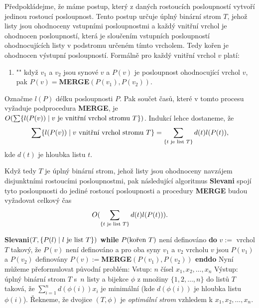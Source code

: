 \documentclass[a4paper,12pt]{article}
\begin{document}
Předpokládejme, že máme postup, který z 
daných rostoucích posloupností vytvoří 
jedinou rostoucí po\-sloupnost. Tento postup určuje úplný 
binární strom $T$, jehož listy jsou ohodnoceny vstupními 
posloupnostmi a každý vnitřní vr\-chol je ohodnocen 
posloupností, která je sloučením vstupních posloupností 
ohodnocujících listy v podstromu určeném tímto 
vr\-cholem. Tedy kořen je ohodnocen výstupní posloupností. 
Formálně pro každý vnitřní vr\-chol  $v$ platí:
\begin{enumerate}
\item"{}"
když  $v_1$ a $v_2$ jsou synové $v$ a $P(v)$ je posloupnost 
ohodnocující vrchol $v$,  pak\newline 
$P(v)=${\bf MERGE$(P(v_1),P(v_2))$}.
\end{enumerate}
Označme $l(P)$ délku posloupnosti $P$. Pak součet 
časů, které v tomto procesu vyžaduje 
podprocedura {\bf MERGE},
je $O(\sum \{l(P(v))\mid v\text{\rm \ je vnitřní vrchol stromu }
T\})$. Indukcí 
lehce dostaneme, že 
$$\sum \{l(P(v))\mid v\text{\rm \ vnitřní vrchol stromu }T
\}=\sum_{\{t\text{\rm \ je list }T\}}d(t)l(P(t)),$$
kde $d(t)$ je hloubka listu $t$.

Když tedy $T$ je úplný binární strom, jehož listy
jsou ohodnoceny navzájem disjunktními rostoucími  
posloupnostmi, pak následující algoritmus {\bf Slevani} spojí tyto  
posloupnosti do jediné rostoucí posloupnosti a procedury 
{\bf MERGE} budou vyžadovat celkový čas 
$$O(\sum_{\{t\text{\rm \ je list }T\}}d(t)l(P(t))).$$

{\bf Slevani$(T,\{P(l)\mid l\text{\rm \ je list }T\})$\newline 
while} $P(\text{\rm kořen }T)$ není definováno {\bf do\newline 
\phantom{{\rm---}}}$v:=$ vrchol $T$ takový, že $P(v)$ není 
definováno a\newline 
\phantom{---}pro oba syny $v_1$ a $v_2$ vrcholu $v$ jsou $P(v_1)$ a $
P(v_2)$ definovány\newline 
\phantom{---}$P(v):=${\bf MERGE$(P(v_1),P(v_2))$\newline 
enddo
}
Nyní můžeme přeformulovat původní 
problém:\newline 
Vstup: $n$ čísel $x_1,x_2,\dots,x_n$\newline 
Výstup: úplný binární strom $T$ s~$n$ listy a bijekce $
\phi$ z 
množiny $\{1,2,\dots,n\}$ do listů $T$ taková, že 
$\sum_{i=1}^nd(\phi (i))x_i$ je minimální (kde $d(\phi (i))$ je hloubka 
listu $\phi (i)$).\newline 
Řekneme, že dvojice $(T,\phi )$ je \emph{optimální} 
\emph{strom} vzhledem k $x_1,x_2,\dots,x_n$. 
\end{document}
